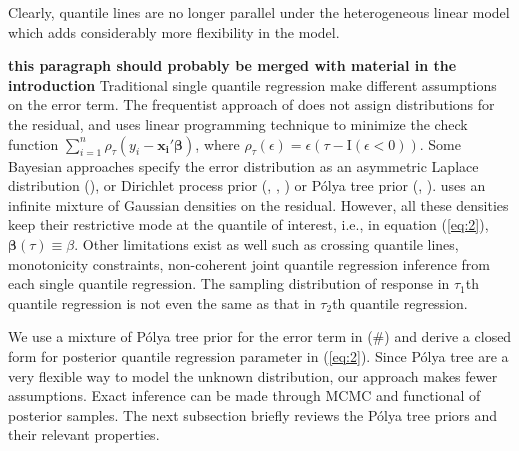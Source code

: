 \documentclass[12pt]{article}
\newcommand{\polya}{P\'{o}lya}
\begin{document}
Clearly, quantile lines
are no longer parallel
under the heterogeneous linear model which adds considerably more
flexibility in the model.

{\bf this paragraph should probably be merged with material in the
  introduction} Traditional single quantile regression make different assumptions on
the error term. The frequentist approach of \citet{koenker1978} does not 
assign distributions for the residual, and uses linear
programming technique to minimize the check function $\sum_{i=1}^n
\rho_{\tau}(y_i - \bm{x_i'\beta})$, where $\rho_{\tau}(\epsilon) =
\epsilon (\tau- \mathrm{I}(\epsilon < 0))$. 
Some Bayesian 
approaches specify the error distribution as an asymmetric Laplace
distribution (\citet{yu2001}), or Dirichlet process prior
(\citet{kottas2001}, \citet{kottas2009},  \citet{taddy2010}) or
\polya{} tree prior (\citet{walker1999}, \citet{hanson2002}). \citet{reich2010}
uses an infinite mixture of Gaussian densities on the 
residual. However, all these densities keep their
restrictive mode at the quantile of interest, i.e., in equation
(\ref{eq:2}), $\bm{\beta}(\tau) \equiv \beta$. Other limitations exist
as well such as crossing quantile lines, monotonicity constraints,
non-coherent joint quantile regression inference from each single
quantile regression. The sampling distribution of response in
$\tau_1$th quantile regression is not even the same as that in
$\tau_2$th quantile regression.

We use a mixture of \polya{} tree prior for the error term in (\#) and
derive a
closed form for posterior quantile regression parameter in
(\ref{eq:2}). 
Since \polya{}
tree are a very flexible way to model the unknown distribution, our
approach makes fewer assumptions. 
Exact
inference can be made through MCMC and functional of posterior
samples. The next subsection briefly reviews the \polya{} tree priors and
their relevant properties.
\end{document}
